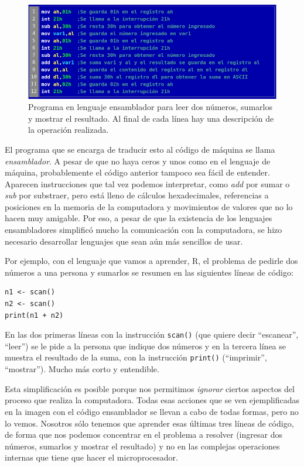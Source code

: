 \documentclass[
]{book}
\begin{document}
\begin{figure}

{\centering \includegraphics[width=1\linewidth]{images/intro/ensamblador} 

}

\caption{Programa en lenguaje ensamblador para leer dos números, sumarlos y mostrar el resultado. Al final de cada línea hay una descripción de la operación realizada.}\label{fig:unnamed-chunk-5}
\end{figure}

El programa que se encarga de traducir esto al código de máquina se llama \emph{ensamblador}. A pesar de que no haya ceros y unos como en el lenguaje de máquina, probablemente el código anterior tampoco sea fácil de entender. Aparecen instrucciones que tal vez podemos interpretar, como \emph{add} por sumar o \emph{sub} por substraer, pero está lleno de cálculos hexadecimales, referencias a posiciones en la memoria de la computadora y movimientos de valores que no lo hacen muy amigable. Por eso, a pesar de que la existencia de los lenguajes ensambladores simplificó mucho la comunicación con la computadora, se hizo necesario desarrollar lenguajes que sean aún más sencillos de usar.

Por ejemplo, con el lenguaje que vamos a aprender, R, el problema de pedirle dos números a una persona y sumarlos se resumen en las siguientes líneas de código:

\begin{verbatim}
n1 <- scan()
n2 <- scan()
print(n1 + n2)
\end{verbatim}

En las dos primeras líneas con la instrucción \texttt{scan()} (que quiere decir ``escanear'', ``leer'') se le pide a la persona que indique dos números y en la tercera línea se muestra el resultado de la suma, con la instrucción \texttt{print()} (``imprimir'', ``mostrar''). Mucho más corto y entendible.

Esta simplificación es posible porque nos permitimos \emph{ignorar} ciertos aspectos del proceso que realiza la computadora. Todas esas acciones que se ven ejemplificadas en la imagen con el código ensamblador se llevan a cabo de todas formas, pero no lo vemos. Nosotros sólo tenemos que aprender esas últimas tres líneas de código, de forma que nos podemos concentrar en el problema a resolver (ingresar dos números, sumarlos y mostrar el resultado) y no en las complejas operaciones internas que tiene que hacer el microprocesador.
\end{document}
